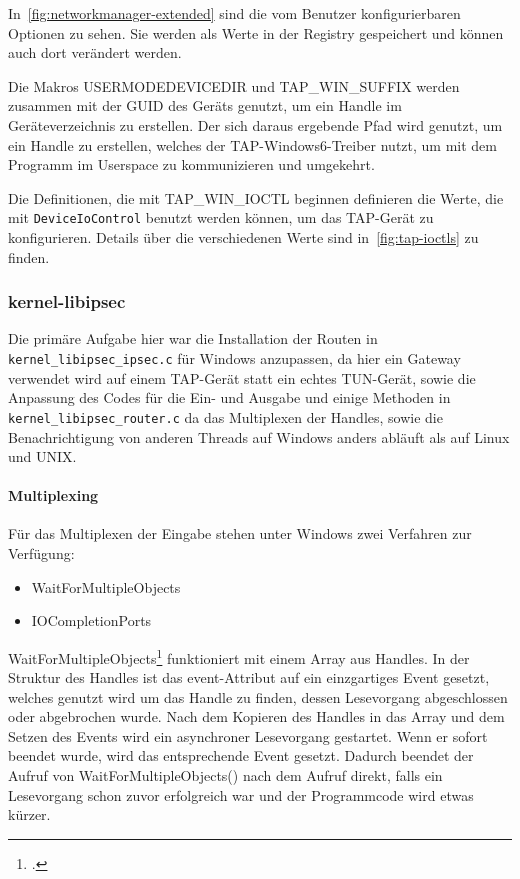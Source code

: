 {In~\autoref{fig:networkmanager-extended} sind die vom Benutzer konfigurierbaren Optionen zu sehen.
Sie werden als Werte in der Registry gespeichert und können auch dort verändert werden.

Die Makros USERMODEDEVICEDIR und TAP\_WIN\_SUFFIX werden zusammen mit der GUID des Geräts
genutzt, um ein Handle im Geräteverzeichnis zu erstellen. Der sich daraus ergebende Pfad
wird genutzt, um ein Handle zu erstellen, welches der TAP-Windows6-Treiber nutzt, um
mit dem Programm im Userspace zu kommunizieren und umgekehrt.

Die Definitionen, die mit TAP\_WIN\_IOCTL beginnen definieren die Werte, die mit
\texttt{DeviceIoControl} benutzt werden können, um das TAP-Gerät zu konfigurieren. Details über die verschiedenen
Werte sind in~\autoref{fig:tap-ioctls} zu finden.


\subsubsection{kernel-libipsec}
Die primäre Aufgabe hier war die Installation der Routen in \texttt{kernel\_libipsec\_ipsec.c}
für Windows anzupassen, da hier ein Gateway verwendet wird auf einem TAP-Gerät
statt ein echtes TUN-Gerät, sowie die Anpassung des Codes für die Ein- und Ausgabe 
und einige Methoden in
\texttt{kernel\_libipsec\_router.c} da das Multiplexen der Handles, sowie die Benachrichtigung
von anderen Threads auf Windows anders abläuft als auf Linux und UNIX.

\paragraph{Multiplexing}
Für das Multiplexen der Eingabe stehen unter Windows zwei Verfahren zur Verfügung:
\begin{itemize}
\item WaitForMultipleObjects
\item IOCompletionPorts
\end{itemize}

WaitForMultipleObjects\footcite[][]{_waitformultipleobjects_2016} funktioniert mit einem Array aus Handles. In der Struktur des Handles
ist das event-Attribut auf ein einzgartiges Event gesetzt, welches genutzt wird um
das Handle zu finden, dessen Lesevorgang abgeschlossen oder abgebrochen wurde.
Nach dem Kopieren des Handles in das Array und dem Setzen des Events wird ein asynchroner
Lesevorgang gestartet. Wenn er sofort beendet wurde, wird das entsprechende Event gesetzt.
Dadurch beendet der Aufruf von WaitForMultipleObjects() nach dem Aufruf direkt, falls
ein Lesevorgang schon zuvor erfolgreich war und der Programmcode wird etwas kürzer.

}
